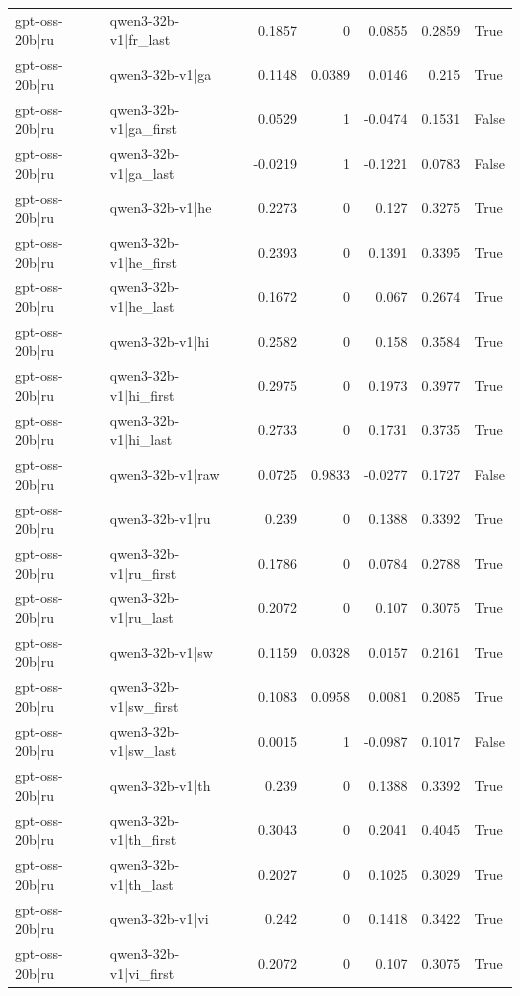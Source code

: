 \begin{table}
\begin{tabular}{l l r r r r l}
gpt-oss-20b|ru & qwen3-32b-v1|fr_last & 0.1857 & 0 & 0.0855 & 0.2859 & True \\
gpt-oss-20b|ru & qwen3-32b-v1|ga & 0.1148 & 0.0389 & 0.0146 & 0.215 & True \\
gpt-oss-20b|ru & qwen3-32b-v1|ga_first & 0.0529 & 1 & -0.0474 & 0.1531 & False \\
gpt-oss-20b|ru & qwen3-32b-v1|ga_last & -0.0219 & 1 & -0.1221 & 0.0783 & False \\
gpt-oss-20b|ru & qwen3-32b-v1|he & 0.2273 & 0 & 0.127 & 0.3275 & True \\
gpt-oss-20b|ru & qwen3-32b-v1|he_first & 0.2393 & 0 & 0.1391 & 0.3395 & True \\
gpt-oss-20b|ru & qwen3-32b-v1|he_last & 0.1672 & 0 & 0.067 & 0.2674 & True \\
gpt-oss-20b|ru & qwen3-32b-v1|hi & 0.2582 & 0 & 0.158 & 0.3584 & True \\
gpt-oss-20b|ru & qwen3-32b-v1|hi_first & 0.2975 & 0 & 0.1973 & 0.3977 & True \\
gpt-oss-20b|ru & qwen3-32b-v1|hi_last & 0.2733 & 0 & 0.1731 & 0.3735 & True \\
gpt-oss-20b|ru & qwen3-32b-v1|raw & 0.0725 & 0.9833 & -0.0277 & 0.1727 & False \\
gpt-oss-20b|ru & qwen3-32b-v1|ru & 0.239 & 0 & 0.1388 & 0.3392 & True \\
gpt-oss-20b|ru & qwen3-32b-v1|ru_first & 0.1786 & 0 & 0.0784 & 0.2788 & True \\
gpt-oss-20b|ru & qwen3-32b-v1|ru_last & 0.2072 & 0 & 0.107 & 0.3075 & True \\
gpt-oss-20b|ru & qwen3-32b-v1|sw & 0.1159 & 0.0328 & 0.0157 & 0.2161 & True \\
gpt-oss-20b|ru & qwen3-32b-v1|sw_first & 0.1083 & 0.0958 & 0.0081 & 0.2085 & True \\
gpt-oss-20b|ru & qwen3-32b-v1|sw_last & 0.0015 & 1 & -0.0987 & 0.1017 & False \\
gpt-oss-20b|ru & qwen3-32b-v1|th & 0.239 & 0 & 0.1388 & 0.3392 & True \\
gpt-oss-20b|ru & qwen3-32b-v1|th_first & 0.3043 & 0 & 0.2041 & 0.4045 & True \\
gpt-oss-20b|ru & qwen3-32b-v1|th_last & 0.2027 & 0 & 0.1025 & 0.3029 & True \\
gpt-oss-20b|ru & qwen3-32b-v1|vi & 0.242 & 0 & 0.1418 & 0.3422 & True \\
gpt-oss-20b|ru & qwen3-32b-v1|vi_first & 0.2072 & 0 & 0.107 & 0.3075 & True \\

\end{tabular}
\end{table}
